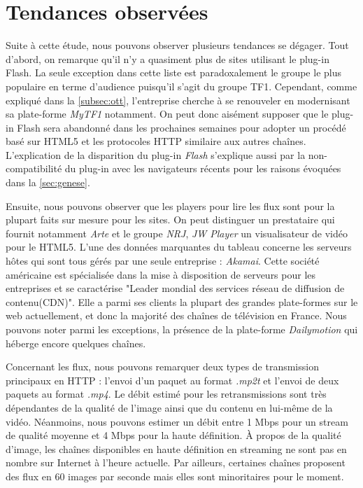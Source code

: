 \documentclass{polytech/polytech}
\begin{document}
\section{Tendances observées}


Suite à cette étude, nous pouvons observer plusieurs tendances se dégager. Tout d'abord, on remarque qu'il n'y a quasiment plus de sites utilisant le plug-in Flash. La seule exception dans cette liste est paradoxalement le groupe le plus populaire en terme d'audience puisqu'il s'agit du groupe TF1. Cependant, comme expliqué dans la \autoref{subsec:ott}, l'entreprise cherche à se renouveler en modernisant sa plate-forme \textit{MyTF1} notamment. On peut donc aisément supposer que le plug-in Flash sera abandonné dans les prochaines semaines pour adopter un procédé basé sur HTML5 et les protocoles HTTP similaire aux autres chaînes. L'explication de la disparition du plug-in \textit{Flash} s'explique aussi par la non-compatibilité du plug-in avec les navigateurs récents pour les raisons évoquées dans la \autoref{sec:genese}.

Ensuite, nous pouvons observer que les players pour lire les flux sont pour la plupart faits sur mesure pour les sites. On peut distinguer un prestataire qui fournit notamment \textit{Arte} et le groupe \textit{NRJ}, \textit{JW Player} un visualisateur de vidéo pour le HTML5. L'une des données marquantes du tableau concerne les serveurs hôtes qui sont tous gérés par une seule entreprise : \textit{Akamai}. Cette société américaine est spécialisée dans la mise à disposition de serveurs pour les entreprises et se caractérise "Leader mondial des services réseau de diffusion de contenu(CDN)". Elle a parmi ses clients la plupart des grandes plate-formes sur le web actuellement, et donc la majorité des chaînes de télévision en France. Nous pouvons noter parmi les exceptions, la présence de la plate-forme \textit{Dailymotion} qui héberge encore quelques chaînes.

Concernant les flux, nous pouvons remarquer deux types de transmission principaux en HTTP : l'envoi d'un paquet au format \textit{.mp2t} et l'envoi de deux paquets au format \textit{.mp4}. Le débit estimé pour les retransmissions sont très dépendantes de la qualité de l'image ainsi que du contenu en lui-même de la vidéo. Néanmoins, nous pouvons estimer un débit entre 1 Mbps pour un stream de qualité moyenne et 4 Mbps pour la haute définition. À propos de la qualité d'image, les chaînes disponibles en haute définition en streaming ne sont pas en nombre sur Internet à l'heure actuelle. Par ailleurs, certaines chaînes proposent des flux en 60 images par seconde mais elles sont minoritaires pour le moment. 
\end{document}
